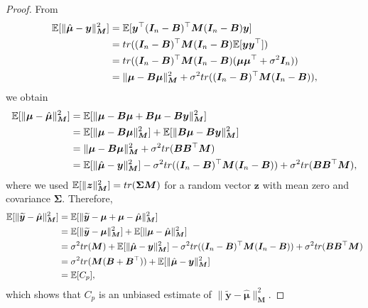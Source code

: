 \documentclass[10pt,a4paper]{amsart}
\newcommand{\mtx}[1]{\bm{#1}}
\newcommand{\vct}[1]{\bm{#1}}
\begin{document}
\begin{proof}
	From
	\begin{align*}
		{\mathbb{E}} [ \| \hat{\vct{\mu}}-\vct{y} \|_{\mtx{M}}^2] &= {\mathbb{E}} [\vct{y}^{\top} (\mtx{I}_n-\mtx{B})^{\top} \mtx{M} (\mtx{I}_n-\mtx{B}) \vct{y}] \\
		&= {\rm tr} ((\mtx{I}_n-\mtx{B})^{\top} \mtx{M} (\mtx{I}_n-\mtx{B}) {\mathbb{E}} [\vct{y} \vct{y}^{\top}]) \\
		&= {\rm tr} ((\mtx{I}_n-\mtx{B})^{\top} \mtx{M} (\mtx{I}_n-\mtx{B}) (\vct{\mu} \vct{\mu}^{\top}+\sigma^2 \mtx{I}_n)) \\
		&= \| \vct{\mu} -\mtx{B} \vct{\mu} \|_{\mtx{M}}^2 + \sigma^2 {\rm tr} ((\mtx{I}_n-\mtx{B})^{\top} \mtx{M} (\mtx{I}_n-\mtx{B})),
	\end{align*}
	we obtain
	\begin{align*}
		{\mathbb{E}} [ \| {\vct{\mu}}-\hat{\vct{\mu}} \|_{\mtx{M}}^2 ] &= {\mathbb{E}} [ \| {\vct{\mu}}-\mtx{B} \vct{\mu}+\mtx{B} \vct{\mu}-\mtx{B} \vct{y} \|_{\mtx{M}}^2 ] \\
		&= {\mathbb{E}} [\| {\vct{\mu}}-\mtx{B} \vct{\mu} \|_{\mtx{M}}^2] + {\mathbb{E}} [\| \mtx{B} \vct{\mu}-\mtx{B} \vct{y} \|_{\mtx{M}}^2] \\
		&= \| {\vct{\mu}}-\mtx{B} \vct{\mu} \|_{\mtx{M}}^2 + \sigma^2 {\rm tr} (\mtx{B} \mtx{B}^{\top} \mtx{M}) \\
		&= {\mathbb{E}} [\| \hat{\vct{\mu}}-\vct{y} \|_{\mtx{M}}^2] - \sigma^2 {\rm tr} ((\mtx{I}_n-\mtx{B})^{\top} \mtx{M} (\mtx{I}_n-\mtx{B})) + \sigma^2 {\rm tr} (\mtx{B} \mtx{B}^{\top} \mtx{M}),
	\end{align*}
	where we used ${\mathbb{E}} [\| \vct{z} \|_{\mtx{M}}^2] = {\rm tr} (\mtx{\Sigma} \mtx{M})$ for a random vector $\vct{z}$ with mean zero and covariance $\mtx{\Sigma}$.
	Therefore,
	\begin{align*}
		{\mathbb{E}} [\| \widetilde{\vct{y}}-\hat{\vct{\mu}} \|_{\mtx{M}}^2] &= {\mathbb{E}} [\| \widetilde{\vct{y}}-\vct{\mu}+\vct{\mu}-\hat{\vct{\mu}} \|_{\mtx{M}}^2] \\
		&={\mathbb{E}} [\| \widetilde{\vct{y}}-{\vct{\mu}} \|_{\mtx{M}}^2] + {\mathbb{E}} [\| {\vct{\mu}}-\hat{\vct{\mu}} \|_{\mtx{M}}^2] \\
		&= \sigma^2 {\rm tr} (\mtx{M}) +{\mathbb{E}} [\| \hat{\vct{\mu}}-\vct{y} \|_{\mtx{M}}^2] - \sigma^2 {\rm tr} ((\mtx{I}_n-\mtx{B})^{\top} \mtx{M} (\mtx{I}_n-\mtx{B})) + \sigma^2 {\rm tr} (\mtx{B} \mtx{B}^{\top} \mtx{M}) \\
		&= \sigma^2 {\rm tr} (\mtx{M} (\mtx{B}+\mtx{B}^{\top})) + {\mathbb{E}} [\| \hat{\vct{\mu}}-\vct{y} \|_{\mtx{M}}^2] \\
		&= {\mathbb{E}} [C_p],
	\end{align*}
	which shows that $C_p$ is an unbiased estimate of $\| \widetilde{\vct{y}}-\hat{\vct{\mu}} \|_{\mtx{M}}^2$. 
\end{proof}
\end{document}
